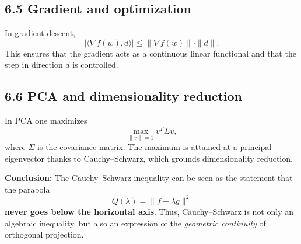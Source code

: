 \documentclass[12pt]{article}
\begin{document}
\subsection*{6.5 Gradient and optimization}
In gradient descent,
\[
|\langle \nabla f(w), d\rangle| \leq \|\nabla f(w)\| \cdot \|d\|.
\]
This ensures that the gradient acts as a continuous linear functional 
and that the step in direction $d$ is controlled.

\subsection*{6.6 PCA and dimensionality reduction}
In PCA one maximizes
\[
\max_{\|v\|=1} v^T \Sigma v,
\]
where $\Sigma$ is the covariance matrix. 
The maximum is attained at a principal eigenvector thanks to Cauchy--Schwarz, 
which grounds dimensionality reduction.

\bigskip
\noindent
\textbf{Conclusion:}  
The Cauchy--Schwarz inequality can be seen as the statement that the parabola
\[
Q(\lambda) = \|f - \lambda g\|^2
\]
\textbf{never goes below the horizontal axis}.  
Thus, Cauchy--Schwarz is not only an algebraic inequality, 
but also an expression of the \emph{geometric continuity} of orthogonal projection.
\end{document}
